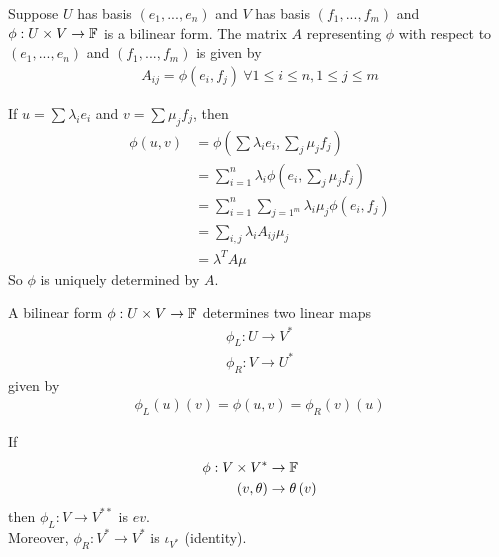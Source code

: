 \documentclass[a4paper]{article}
\begin{document}
\begin{defi}
Suppose $U$ has basis $\left(e_1,...,e_n\right)$ and $V$ has basis $\left(f_1,...,f_m\right)$ and $\phi:U \times V \to \mathbb{F}$ is a bilinear form. The matrix $A$ representing $\phi$ with respect to $\left(e_1,...,e_n\right)$ and $\left(f_1,...,f_m\right)$ is given by
\begin{equation*}
\begin{aligned}
A_{ij} = \phi \left(e_i,f_j\right) \ \forall 1\leq i \leq n, 1\leq j \leq m
\end{aligned}
\end{equation*}
\end{defi}

\begin{rem}
If $u = \sum \lambda_i e_i$ and $v=\sum \mu_j f_j$, then
\begin{equation*}
\begin{aligned}
\phi\left(u,v\right) &= \phi\left(\sum \lambda_i e_i,\sum_j \mu_j f_j\right)\\
&= \sum_{i=1}^n \lambda_i\phi\left(e_i,\sum_j \mu_j f_j\right)\\
&= \sum_{i=1}^n \sum_{j=1^m} \lambda_i \mu_j \phi\left(e_i,f_j\right)\\
&= \sum_{i,j} \lambda_i A_{ij} \mu_j\\
&= \lambda^T A \mu
\end{aligned}
\end{equation*}
So $\phi$ is uniquely determined by $A$.
\end{rem}

\begin{defi}
A bilinear form $\phi: U \times V \to \mathbb{F}$ determines two linear maps
\begin{equation*}
\begin{aligned}
\phi_L: U \to V^*\\
\phi_R: V \to U^*
\end{aligned}
\end{equation*}
given by
\begin{equation*}
\begin{aligned}
\phi_L\left(u\right) \left(v\right) = \phi\left(u,v\right)=\phi_R\left(v\right)\left(u\right)
\end{aligned}
\end{equation*}
\end{defi}

\begin{eg}
If
\begin{equation*}
\begin{aligned}
\phi:V \times V^* &\to \mathbb{F}\\
\left(v,\theta\right) &\to \theta\left(v\right)
\end{aligned}
\end{equation*}
then $\phi_L:V\to V^{**}$ is $ev$.\\
Moreover, $\phi_R:V^* \to V^*$ is $\iota_{V^*}$ (identity).
\end{eg}
\end{document}
